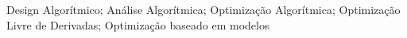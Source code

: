 \noindent Design Algorítmico; Análise Algorítmica; Optimização Algorítmica; Optimização Livre de Derivadas; Optimização baseado em modelos

